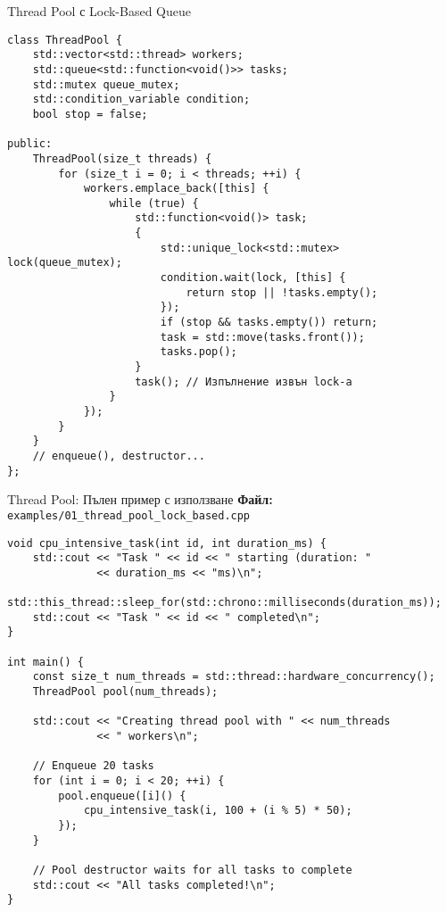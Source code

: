 \documentclass[aspectratio=169]{beamer}
\begin{document}
\begin{frame}[fragile]{Thread Pool с Lock-Based Queue}
\begin{lstlisting}[basicstyle=\ttfamily\tiny]
class ThreadPool {
    std::vector<std::thread> workers;
    std::queue<std::function<void()>> tasks;
    std::mutex queue_mutex;
    std::condition_variable condition;
    bool stop = false;

public:
    ThreadPool(size_t threads) {
        for (size_t i = 0; i < threads; ++i) {
            workers.emplace_back([this] {
                while (true) {
                    std::function<void()> task;
                    {
                        std::unique_lock<std::mutex> lock(queue_mutex);
                        condition.wait(lock, [this] { 
                            return stop || !tasks.empty(); 
                        });
                        if (stop && tasks.empty()) return;
                        task = std::move(tasks.front());
                        tasks.pop();
                    }
                    task(); // Изпълнение извън lock-а
                }
            });
        }
    }
    // enqueue(), destructor...
};
\end{lstlisting}
\end{frame}

\begin{frame}[fragile]{Thread Pool: Пълен пример с използване}
\textbf{Файл:} \texttt{examples/01\_thread\_pool\_lock\_based.cpp}
\begin{lstlisting}[basicstyle=\ttfamily\tiny]
void cpu_intensive_task(int id, int duration_ms) {
    std::cout << "Task " << id << " starting (duration: " 
              << duration_ms << "ms)\n";
    std::this_thread::sleep_for(std::chrono::milliseconds(duration_ms));
    std::cout << "Task " << id << " completed\n";
}

int main() {
    const size_t num_threads = std::thread::hardware_concurrency();
    ThreadPool pool(num_threads);
    
    std::cout << "Creating thread pool with " << num_threads 
              << " workers\n";
    
    // Enqueue 20 tasks
    for (int i = 0; i < 20; ++i) {
        pool.enqueue([i]() {
            cpu_intensive_task(i, 100 + (i % 5) * 50);
        });
    }
    
    // Pool destructor waits for all tasks to complete
    std::cout << "All tasks completed!\n";
}
\end{lstlisting}
\end{frame}
\end{document}

